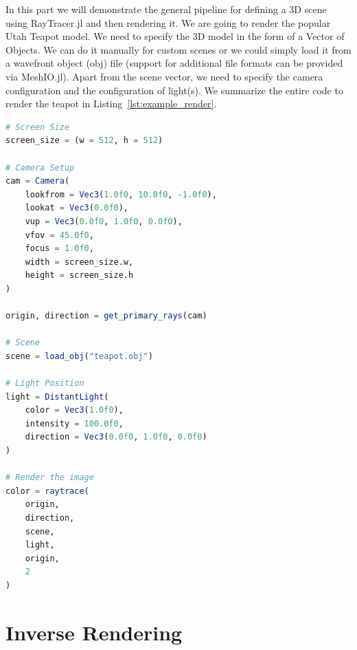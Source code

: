 \documentclass{juliacon}
\begin{document}
In this part we will demonstrate the general pipeline for defining a 3D scene using RayTracer.jl and then rendering it. We are going to render the popular Utah Teapot model. We need to specify the 3D model in the form of a Vector of Objects. We can do it manually for custom scenes or we could simply load it from a wavefront object (obj) file (support for additional file formats can be provided via MeshIO.jl). Apart from the scene vector, we need to specify the camera configuration and the configuration of light(s). We summarize the entire code to render the teapot in Listing~\ref{lst:example_render}. 

\begin{lstlisting}[caption = {Rendering the Utah Teapot Model},
                   label = {lst:example_render},
                   captionpos = b,
                   language = Julia]
# Screen Size
screen_size = (w = 512, h = 512)
    
# Camera Setup
cam = Camera(
    lookfrom = Vec3(1.0f0, 10.0f0, -1.0f0),
    lookat = Vec3(0.0f0),
    vup = Vec3(0.0f0, 1.0f0, 0.0f0),
    vfov = 45.0f0,
    focus = 1.0f0,
    width = screen_size.w,
    height = screen_size.h
)
                 
origin, direction = get_primary_rays(cam)
    
# Scene
scene = load_obj("teapot.obj")
    
# Light Position
light = DistantLight(
    color = Vec3(1.0f0),
    intensity = 100.0f0,
    direction = Vec3(0.0f0, 1.0f0, 0.0f0)
)
                         
# Render the image
color = raytrace(
    origin,
    direction,
    scene,
    light,
    origin,
    2
)
\end{lstlisting}

\section{Inverse Rendering}
\end{document}
